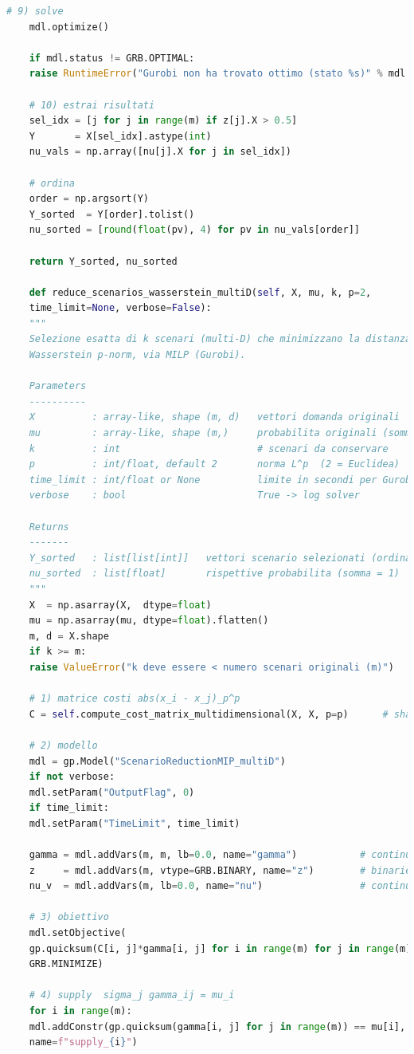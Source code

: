 \documentclass[a4paper,12pt]{article}
\begin{document}
\begin{lstlisting}[language=python,caption={class ScenarioTree},label={lst:class-scenario-tree}]
	# 9) solve
	mdl.optimize()
	
	if mdl.status != GRB.OPTIMAL:
	raise RuntimeError("Gurobi non ha trovato ottimo (stato %s)" % mdl.Status)
	
	# 10) estrai risultati
	sel_idx = [j for j in range(m) if z[j].X > 0.5]
	Y       = X[sel_idx].astype(int)
	nu_vals = np.array([nu[j].X for j in sel_idx])
	
	# ordina
	order = np.argsort(Y)
	Y_sorted  = Y[order].tolist()
	nu_sorted = [round(float(pv), 4) for pv in nu_vals[order]]
	
	return Y_sorted, nu_sorted
	
	def reduce_scenarios_wasserstein_multiD(self, X, mu, k, p=2,
	time_limit=None, verbose=False):
	"""
	Selezione esatta di k scenari (multi-D) che minimizzano la distanza
	Wasserstein p-norm, via MILP (Gurobi).
	
	Parameters
	----------
	X          : array-like, shape (m, d)   vettori domanda originali
	mu         : array-like, shape (m,)     probabilita originali (somma = 1)
	k          : int                        # scenari da conservare
	p          : int/float, default 2       norma L^p  (2 = Euclidea)
	time_limit : int/float or None          limite in secondi per Gurobi
	verbose    : bool                       True -> log solver
	
	Returns
	-------
	Y_sorted   : list[list[int]]   vettori scenario selezionati (ordinati)
	nu_sorted  : list[float]       rispettive probabilita (somma = 1)
	"""
	X  = np.asarray(X,  dtype=float)
	mu = np.asarray(mu, dtype=float).flatten()
	m, d = X.shape
	if k >= m:
	raise ValueError("k deve essere < numero scenari originali (m)")
	
	# 1) matrice costi abs(x_i - x_j)_p^p
	C = self.compute_cost_matrix_multidimensional(X, X, p=p)      # shape (m, m)
	
	# 2) modello 
	mdl = gp.Model("ScenarioReductionMIP_multiD")
	if not verbose:
	mdl.setParam("OutputFlag", 0)
	if time_limit:
	mdl.setParam("TimeLimit", time_limit)
	
	gamma = mdl.addVars(m, m, lb=0.0, name="gamma")           # continue
	z     = mdl.addVars(m, vtype=GRB.BINARY, name="z")        # binarie
	nu_v  = mdl.addVars(m, lb=0.0, name="nu")                 # continue
	
	# 3) obiettivo
	mdl.setObjective(
	gp.quicksum(C[i, j]*gamma[i, j] for i in range(m) for j in range(m)),
	GRB.MINIMIZE)
	
	# 4) supply  sigma_j gamma_ij = mu_i
	for i in range(m):
	mdl.addConstr(gp.quicksum(gamma[i, j] for j in range(m)) == mu[i],
	name=f"supply_{i}")
	

\end{lstlisting}
\end{document}
